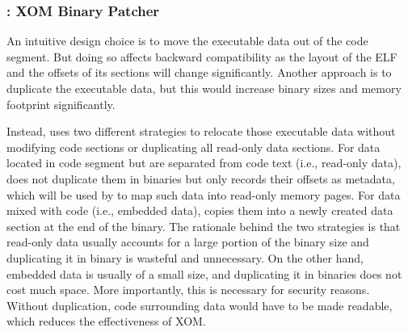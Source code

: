 \subsubsection{\NPatcher: XOM Binary Patcher}
An intuitive design choice is to move the executable data out of the code segment. But doing so affects backward compatibility as the layout of the ELF and the offsets of its sections will change significantly. Another approach is to duplicate the executable data, but this would increase binary sizes and memory footprint significantly. 

Instead, \NPatcher uses two different strategies to relocate those executable data without modifying code sections or duplicating all read-only data sections. 
For data located in code segment but are separated from code text (i.e., read-only data), \NPatcher does not duplicate them in binaries but only records their offsets as metadata, which will be used by \NLoader to map such data into read-only memory pages. 
For data mixed with code (i.e., embedded data), \NPatcher copies them into a newly created data section at the end of the binary. The rationale behind the two strategies is that read-only data usually accounts for a large portion of the binary size and duplicating it in binary is wasteful and unnecessary. On the other hand, embedded data is usually of a small size, and duplicating it in binaries does not cost much space. More importantly, this is necessary for security reasons. Without duplication, code surrounding data would have to be made readable, which reduces the effectiveness of XOM. 



